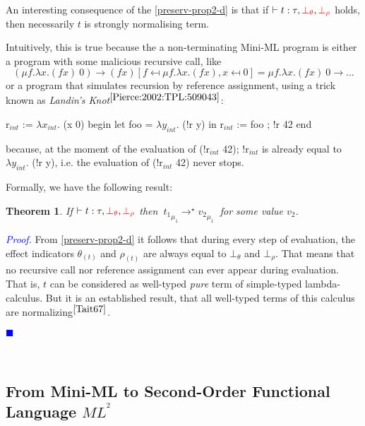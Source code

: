 \documentclass[a4paper,11pt,oneside]{article}
\theoremstyle{plain}
\newtheorem{theorem}[definition]{Theorem}
\renewenvironment{proof}{\noindent \textcolor{blue}{\textit{Proof.}}}
{{\begin{tiny}\textcolor{blue}{$\blacksquare$}\end{tiny}}\\}
\newcommand{\bth}{\bot_\theta}
\newcommand{\brh}{\bot_\rho}
\newcommand{\evalstar}[4]{~#1_{\mu_#2} \rightarrow^{\star} #3_{\mu_#4} ~}
\begin{document}
An interesting consequence of the \cref{preserv-prop2-d} is that if $\vdash t : \tau, \textcolor{red}{\bth}, \textcolor{red}{\brh}$ holds, then necessarily $t$ is strongly normalising term.

Intuitively, this is true because the a non-terminating Mini-ML program is either a program with some malicious recursive call, like 
$$ (\mu f. \lambda x. (f x)~0) \rightarrow (f x) [ f \mapsfrom \mu f. \lambda x. (f x), x \mapsfrom 0] = \mu f. \lambda x. (f x)~0 \rightarrow ... $$ 
or a program that simulates recursion by reference assignment, using a trick known as \textit{Landin's Knot}{\footnotesize$^{\cite{Pierce:2002:TPL:509043}}$}:
\begin{whycode} 
 $\text{r}_{int}$ := $\lambda x_{int}. $ (x 0) 
 begin
   let foo = $\lambda y_{int}$. (!r y)  in 
   $\text{r}_{int}$ := foo ; !r 42 
 end \end{whycode}
because, at the moment of the evaluation of (!r$_{int}$ 42); !r$_{int}$ is already equal to $\lambda y_{int}$. (!r y), i.e. the evaluation of (!r$_{int}$ 42) never stops. 

Formally, we have the following result:
\begin{theorem}
 If $\vdash t : \tau, \textcolor{red}{\bth}, \textcolor{red}{\brh}$ then  $\evalstar{t{_1}}{1}{v{_2}}{1}$ for some value $v_2$.
\end{theorem}
\begin{proof}
  From \cref{preserv-prop2-d} it follows that during every step of evaluation, the effect indicators $\theta_(t)$ and $\rho_(t)$ are always equal to $\bth$ and $\brh$. 
  That means that no recursive call nor reference assignment can ever appear during evaluation.
  That is, $t$ can be considered as well-typed \textit{pure} term of simple-typed lambda-calculus. 
  But it is an established result, that all well-typed terms of this calculus are normalizing{\footnotesize$^{\cite{Tait67}}$}. 
\end{proof}

\subsection{From Mini-ML to Second-Order Functional Language \texorpdfstring{$ML^{^{2}}$}{}}

\end{document}
